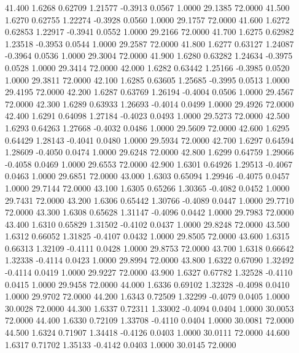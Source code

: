   41.400   1.6268   0.62709   1.21577  -0.3913   0.0567   1.0000  29.1385  72.0000
  41.500   1.6270   0.62755   1.22274  -0.3928   0.0560   1.0000  29.1757  72.0000
  41.600   1.6272   0.62853   1.22917  -0.3941   0.0552   1.0000  29.2166  72.0000
  41.700   1.6275   0.62982   1.23518  -0.3953   0.0544   1.0000  29.2587  72.0000
  41.800   1.6277   0.63127   1.24087  -0.3964   0.0536   1.0000  29.3004  72.0000
  41.900   1.6280   0.63282   1.24634  -0.3975   0.0528   1.0000  29.3414  72.0000
  42.000   1.6282   0.63442   1.25166  -0.3985   0.0520   1.0000  29.3811  72.0000
  42.100   1.6285   0.63605   1.25685  -0.3995   0.0513   1.0000  29.4195  72.0000
  42.200   1.6287   0.63769   1.26194  -0.4004   0.0506   1.0000  29.4567  72.0000
  42.300   1.6289   0.63933   1.26693  -0.4014   0.0499   1.0000  29.4926  72.0000
  42.400   1.6291   0.64098   1.27184  -0.4023   0.0493   1.0000  29.5273  72.0000
  42.500   1.6293   0.64263   1.27668  -0.4032   0.0486   1.0000  29.5609  72.0000
  42.600   1.6295   0.64429   1.28143  -0.4041   0.0480   1.0000  29.5934  72.0000
  42.700   1.6297   0.64594   1.28609  -0.4050   0.0474   1.0000  29.6248  72.0000
  42.800   1.6299   0.64759   1.29066  -0.4058   0.0469   1.0000  29.6553  72.0000
  42.900   1.6301   0.64926   1.29513  -0.4067   0.0463   1.0000  29.6851  72.0000
  43.000   1.6303   0.65094   1.29946  -0.4075   0.0457   1.0000  29.7144  72.0000
  43.100   1.6305   0.65266   1.30365  -0.4082   0.0452   1.0000  29.7431  72.0000
  43.200   1.6306   0.65442   1.30766  -0.4089   0.0447   1.0000  29.7710  72.0000
  43.300   1.6308   0.65628   1.31147  -0.4096   0.0442   1.0000  29.7983  72.0000
  43.400   1.6310   0.65829   1.31502  -0.4102   0.0437   1.0000  29.8248  72.0000
  43.500   1.6312   0.66052   1.31825  -0.4107   0.0432   1.0000  29.8505  72.0000
  43.600   1.6315   0.66313   1.32109  -0.4111   0.0428   1.0000  29.8753  72.0000
  43.700   1.6318   0.66642   1.32338  -0.4114   0.0423   1.0000  29.8994  72.0000
  43.800   1.6322   0.67090   1.32492  -0.4114   0.0419   1.0000  29.9227  72.0000
  43.900   1.6327   0.67782   1.32528  -0.4110   0.0415   1.0000  29.9458  72.0000
  44.000   1.6336   0.69102   1.32328  -0.4098   0.0410   1.0000  29.9702  72.0000
  44.200   1.6343   0.72509   1.32299  -0.4079   0.0405   1.0000  30.0028  72.0000
  44.300   1.6337   0.72311   1.33002  -0.4094   0.0404   1.0000  30.0053  72.0000
  44.400   1.6330   0.72109   1.33708  -0.4110   0.0404   1.0000  30.0081  72.0000
  44.500   1.6324   0.71907   1.34418  -0.4126   0.0403   1.0000  30.0111  72.0000
  44.600   1.6317   0.71702   1.35133  -0.4142   0.0403   1.0000  30.0145  72.0000
